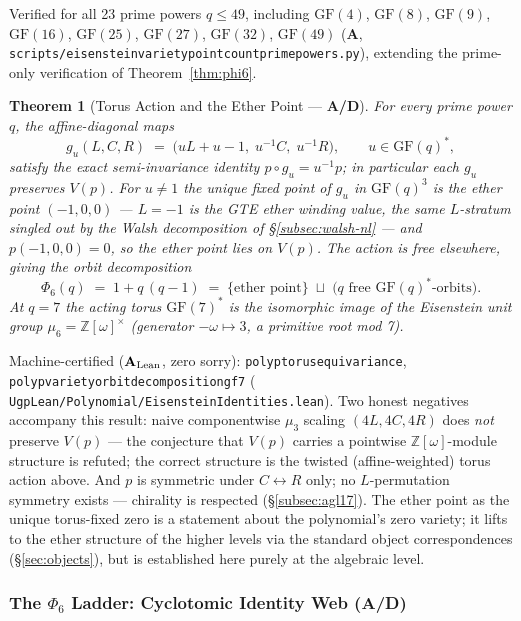 \documentclass[11pt]{article}
\newtheorem{theorem}{Theorem}[section]
\theoremstyle{remark}
\newcommand{\GF}[1]{\ensuremath{\mathrm{GF}(#1)}}
\newcommand{\lean}[1]{%
  \penalty-100
  \begingroup\def\_{\textunderscore\allowbreak}\texttt{#1}\endgroup}
\newcommand{\CatA}{\textbf{A}}
\newcommand{\CatAL}{\texorpdfstring{\ensuremath{\textbf{A}_{\rm Lean}}}{A-Lean}}
\newcommand{\CatAD}{\textbf{A/D}}
\begin{document}
\noindent Verified for all 23 prime powers $q \leq 49$, including
$\GF{4}$, $\GF{8}$, $\GF{9}$, $\GF{16}$, $\GF{25}$, $\GF{27}$, $\GF{32}$,
$\GF{49}$ (\CatA{},
\lean{scripts/eisenstein\_variety\_point\_count\_prime\_powers.py}),
extending the prime-only verification of Theorem~\ref{thm:phi6}.

\begin{theorem}[Torus Action and the Ether Point --- \CatAD{}]
\label{thm:torus}
For every prime power $q$, the affine-diagonal maps
\[
  g_u(L,C,R) \;=\; \bigl(uL + u - 1,\; u^{-1}C,\; u^{-1}R\bigr),
  \qquad u \in \GF{q}^{*},
\]
satisfy the exact semi-invariance identity $p \circ g_u = u^{-1} p$; in
particular each $g_u$ preserves $V(p)$. For $u \neq 1$ the unique fixed
point of $g_u$ in $\GF{q}^3$ is the \emph{ether point} $(-1, 0, 0)$ ---
$L = -1$ is the GTE ether winding value, the same $L$-stratum singled out
by the Walsh decomposition of §\ref{subsec:walsh-nl} --- and
$p(-1,0,0) = 0$, so the ether point lies on $V(p)$. The action is free
elsewhere, giving the orbit decomposition
\[
  \Phi_6(q) \;=\; 1 + q\,(q-1)
  \;=\; \{\text{ether point}\} \;\sqcup\; \text{($q$ free
  $\GF{q}^{*}$-orbits)}.
\]
At $q = 7$ the acting torus $\GF{7}^*$ is the isomorphic image of the
Eisenstein unit group $\mu_6 = \mathbb{Z}[\omega]^{\times}$ (generator
$-\omega \mapsto 3$, a primitive root mod 7).
\end{theorem}

Machine-certified (\CatAL{}, zero sorry):
\lean{poly\_p\_torus\_equivariance},
\lean{poly\_p\_variety\_orbit\_decomposition\_gf7}
(\lean{UgpLean/Polynomial/EisensteinIdentities.lean}).
Two honest negatives accompany this result: naive componentwise $\mu_3$
scaling $(4L, 4C, 4R)$ does \emph{not} preserve $V(p)$ --- the conjecture
that $V(p)$ carries a pointwise $\mathbb{Z}[\omega]$-module structure is
refuted; the correct structure is the twisted (affine-weighted) torus
action above. And $p$ is symmetric under $C \leftrightarrow R$ only; no
$L$-permutation symmetry exists --- chirality is respected
(§\ref{subsec:agl17}). The ether point as the unique torus-fixed zero is a
statement about the polynomial's zero variety; it lifts to the ether
structure of the higher levels via the standard object correspondences
(§\ref{sec:objects}), but is established here purely at the algebraic
level.

\subsubsection{The \texorpdfstring{$\Phi_6$}{Phi6} Ladder: Cyclotomic
Identity Web (\CatAD{})}
\label{subsubsec:phi6ladder}
\end{document}
